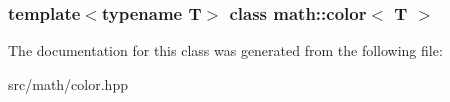 \subsubsection*{template$<$typename T$>$ class math::color$<$ T $>$}



The documentation for this class was generated from the following file:\begin{DoxyCompactItemize}
\item 
src/math/color.hpp\end{DoxyCompactItemize}

